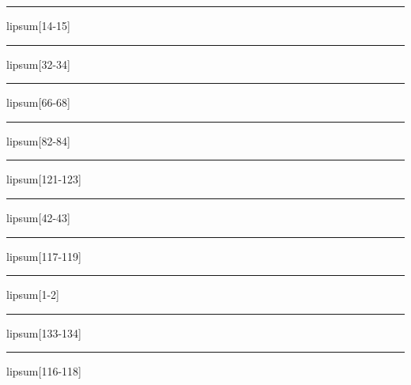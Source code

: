 \documentclass[11pt,a4paper]{article}
\begin{document}
\begin{simplewrap}
  \textcolor{lime!29}{\rule{3.1cm}{9.7cm}}
\end{simplewrap}
lipsum[14-15]

\begin{simplewrap}
  \textcolor{magenta!26}{\rule{4.7cm}{4.5cm}}
\end{simplewrap}
lipsum[32-34]

\begin{simplewrap}
  \textcolor{magenta!38}{\rule{4.2cm}{9.3cm}}
\end{simplewrap}
lipsum[66-68]

\begin{simplewrap}
  \textcolor{magenta!29}{\rule{3.6cm}{9.1cm}}
\end{simplewrap}
lipsum[82-84]

\begin{simplewrap}
  \textcolor{olive!60}{\rule{3.1cm}{8.9cm}}
\end{simplewrap}
lipsum[121-123]

\begin{simplewrap}
  \textcolor{brown!55}{\rule{4.3cm}{9.3cm}}
\end{simplewrap}
lipsum[42-43]

\begin{simplewrap}
  \textcolor{cyan!14}{\rule{4.1cm}{6.8cm}}
\end{simplewrap}
lipsum[117-119]

\begin{simplewrap}
  \textcolor{blue!51}{\rule{4.9cm}{7.0cm}}
\end{simplewrap}
lipsum[1-2]

\begin{simplewrap}
  \textcolor{violet!30}{\rule{4.7cm}{2.9cm}}
\end{simplewrap}
lipsum[133-134]

\begin{simplewrap}
  \textcolor{purple!48}{\rule{5.1cm}{8.3cm}}
\end{simplewrap}
lipsum[116-118]
\end{document}
